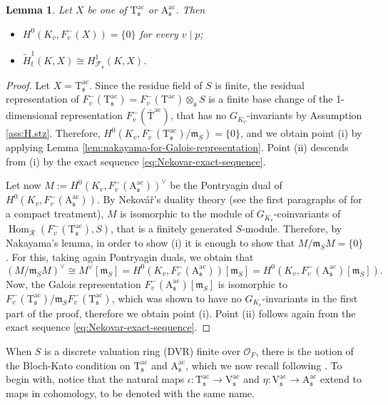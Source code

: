 \documentclass[12pt,reqno]{amsart}
\newtheorem{lemma}[theorem]{Lemma}
\theoremstyle{definition}
\theoremstyle{remark}
\newcommand{\OF}{\mathcal{O}_F}
\newcommand{\V}{\boldsymbol{\mathrm{V}}}
\newcommand{\T}{\boldsymbol{\mathrm{T}}}
\newcommand{\calR}{\mathcal{R}}
\newcommand{\A}{\boldsymbol{\mathrm{A}}}
\DeclareMathOperator{\Hom}{Hom}
\newcommand{\ac}{\mathrm{ac}}
\newcommand{\f}{\mathrm{f}}
\newcommand{\m}{\mathfrak{m}}
\newcommand{\sfrak}{\mathfrak{s}}
\begin{document}
\begin{lemma}\label{lem:equality-Selmer-Nekovar}
    Let $X$ be one of $\T_\sfrak^\ac$ or $\A_\sfrak^\ac$. Then
    \begin{itemize}
        \item[(i)] $H^0(K_v, F_v^-(X))=\{0\}$ for every $v\mid p$;
        \item[(ii)] $\tilde{H}^1_{\f}(K,X)\cong H^1_{\mathcal{F}_\sfrak}(K,X)$.
    \end{itemize}
\end{lemma}
\begin{proof}
    Let $X=\T_\sfrak^\ac$. Since the residue field of $S$ is finite, the residual representation of $F_v^-(\T_\sfrak^\ac)=F_v^-(\T^\ac)\otimes_\sfrak S$ is a finite base change of the 1-dimensional representation $F_v^-(\bar{\T}^\ac)$, that has no $G_{K_v}$-invariants by Assumption \ref{ass:H.stz}. Therefore, $H^0(K_v,F_v^-(\T_\sfrak^\ac)/\m_S)=\{0\}$, and we obtain point (i) by applying Lemma \ref{lem:nakayama-for-Galois-representation}. Point (ii) descends from (i) by the exact sequence \eqref{eq:Nekovar-exact-sequence}. 
    
    Let now $M:=H^0(K_v, F_v^-(\A_\sfrak^\ac))^\vee$ be the Pontryagin dual of $H^0(K_v, F_v^-(\A_\sfrak^\ac))$. By Nekov\' a\v r's duality theory (see the first paragraphs of \cite[§2]{Kim-Longo:anticyclotomic-main-conjecture} for a compact treatment), $M$ is isomorphic to the module of $G_{K_v}$-coinvariants of $\Hom_\calR(F_v^-(\T_\sfrak^\ac),S)$, that is a finitely generated $S$-module. Therefore, by Nakayama's lemma, in order to show (i) it is enough to show that $M/\m_{S}M=\{0\}$. For this, taking again Pontryagin duals, we obtain that
    \begin{equation*}
        (M/\m_{S}M)^\vee\cong M^\vee[\m_S]=H^0(K_v,F_v^-(\A_\sfrak^\ac))[\m_S]=H^0(K_v,F_v^-(\A_\sfrak^\ac)[\m_S]).
    \end{equation*}
    Now, the Galois representation $F_v^-(\A_\sfrak^\ac)[\m_S]$ is isomorphic to $F_v^-(\T_\sfrak^\ac)/\m_S F_v^-(\T_\sfrak^\ac)$, which was shown to have no $G_{K_v}$-invariants in the first part of the proof, therefore we obtain point (i). Point (ii) follows again from the exact sequence \eqref{eq:Nekovar-exact-sequence}.
\end{proof}

When $S$ is a discrete valuation ring (DVR) finite over $\OF$, there is the notion of the Bloch-Kato condition on $\T_{\mathfrak{s}}^{\ac}$ and $\A_{\mathfrak{s}}^{\ac}$, which we now recall following \cite[Definition 5.20]{Fouquet13:Dihedral}. To begin with, notice that the natural maps $\iota\colon \T^\ac_\sfrak\to\V_\sfrak^\ac$ and $\eta\colon\V_\sfrak^\ac\to\A_\sfrak^\ac$ extend to maps in cohomology, to be denoted with the same name.
\end{document}
